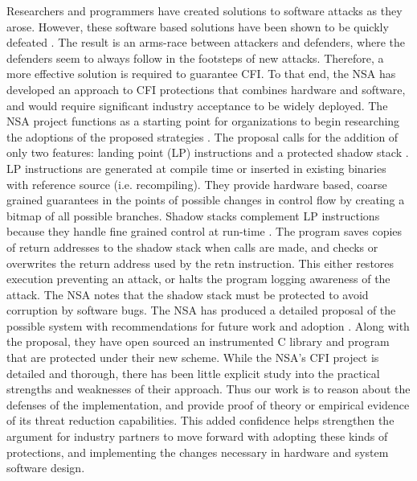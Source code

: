 \documentclass[letterpaper,10pt]{article}
\begin{document}
\newline
\indent Researchers and programmers have created solutions to software attacks as they arose\cite{Cowan, Vendicator}. However, these software based solutions have been shown to be quickly defeated \cite{Richarte}. The result is an arms-race between attackers and defenders, where the defenders seem to always follow in the footsteps of new attacks. Therefore, a more effective solution is required to guarantee CFI. To that end, the NSA has developed an approach to CFI protections that combines hardware and software, and would require significant industry acceptance to be widely deployed. The NSA project functions as a starting point for organizations to begin researching the adoptions of the proposed strategies \cite{NSAGitHub}.
\newline
\indent The proposal calls for the addition of only two features: landing point (LP) instructions and a protected shadow stack \cite{NSAGitHub}. LP instructions are generated at compile time or inserted in existing binaries with reference source (i.e. recompiling). They provide hardware based, coarse grained guarantees in the points of possible changes in control flow by creating a bitmap of all possible branches. Shadow stacks complement LP instructions because they handle fine grained control at run-time \cite{abadi}. The program saves copies of return addresses to the shadow stack when calls are made, and checks or overwrites the return address used by the retn instruction. This either restores execution preventing an attack, or halts the program logging awareness of the attack. The NSA notes that the shadow stack must be protected to avoid corruption by software bugs.
\newline
\indent The NSA has produced a detailed proposal of the possible system with recommendations for future work and adoption \cite{NSAGitHub}. Along with the proposal, they have open sourced an instrumented C library and program that are protected under their new scheme. While the NSA’s CFI project is detailed and thorough, there has been little explicit study into the practical strengths and weaknesses of their approach. Thus our work is to reason about the defenses of the implementation, and provide proof of theory or empirical evidence of its threat reduction capabilities. This added confidence helps strengthen the argument for industry partners to move forward with adopting these kinds of protections, and implementing the changes necessary in hardware and system software design.
\end{document}
